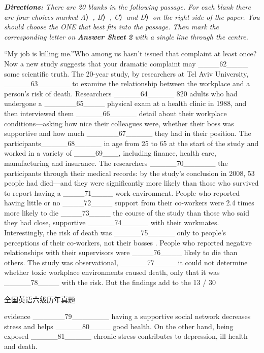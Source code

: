 \documentclass[UTF8,11pt]{ctexart}
\begin{document}
\textbf{\textit{Directions:}}\textit{ There are 20 blanks in the following passage. For each blank there are four choices} \textit{marked A}）\textit{, B}）\textit{, C}）\textit{and D}）\textit{on the right side of the paper. You should choose the ONE} \textit{that best fits into the passage. Then mark the corresponding letter on}\textbf{\textit{ Answer Sheet}} \textbf{\textit{2}}\textit{ with a single line through the centre.}


“My job is killing me.”Who among us hasn't issued that complaint at least once? Now a new study suggests that your dramatic complaint may \_\_\_\_62\_\_\_\_ some scientific truth. The 20-year study, by researchers at Tel Aviv University, \_\_\_\_\_63\_\_\_\_\_\_ to examine the relationship between the workplace and a person's risk of death. Researchers \_\_\_\_\_64\_\_\_\_\_ 820 adults who had undergone a \_\_\_\_\_\_65\_\_\_\_ physical exam at a health clinic in 1988, and then interviewed them \_\_\_\_\_66\_\_\_\_\_ detail about their workplace conditions—asking how nice their colleagues were, whether their boss was supportive and how much \_\_\_\_\_\_67\_\_\_\_\_ they had in their position. The participants\_\_\_\_\_68\_\_\_\_\_ in age from 25 to 65 at the start of the study and worked in a variety of \_\_\_\_69\_\_\_, including finance, health care, manufacturing and insurance. The researchers \_\_\_\_\_70\_\_\_\_\_\_ the participants through their medical records: by the study's conclusion in 2008, 53 people had died—and they were significantly more likely than those who survived to report having a \_\_\_\_71\_\_\_\_ work environment. People who reported having little or no \_\_\_\_72\_\_\_\_ support from their co-workers were 2.4 times more likely to die \_\_\_\_73\_\_\_\_ the course of the study than those who said they had close, supportive \_\_\_\_\_74\_\_\_\_\_ with their workmates. Interestingly, the risk of death was \_\_\_\_\_75\_\_\_\_\_ only to people's perceptions of their co-workers, not their bosses . People who reported negative relationships with their supervisors were \_\_\_\_76\_\_\_\_ likely to die than others. The study was observational, \_\_\_\_\_77\_\_\_\_ it could not determine whether toxic workplace environments caused death, only that it was \_\_\_\_\_78\_\_\_\_ with the risk. But the findings add to the 13 / 30


全国英语六级历年真题


evidence \_\_\_\_\_\_79\_\_\_\_\_\_\_ having a supportive social network decreases stress and helps \_\_\_\_\_80\_\_\_\_ good health. On the other hand, being exposed \_\_\_\_\_81\_\_\_\_\_ chronic stress contributes to depression, ill health and death.
\end{document}
